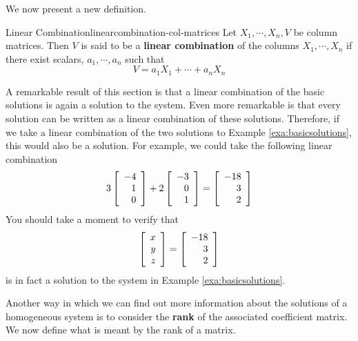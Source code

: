 We now present a new definition. 

\begin{definition}{Linear Combination}{linearcombination-col-matrices}
Let $X_1,\cdots ,X_n,V$ be column matrices. Then 
$V$ is said to be a \textbf{linear combination }
of the columns $X_1,\cdots , X_n $ 
if there exist scalars, $a_{1},\cdots ,a_{n}$ such
that
\begin{equation*}
V = a_1 X_1 + \cdots + a_n X_n
\end{equation*}
\end{definition}

A remarkable result of this section is that a linear combination of the basic solutions is again a solution to the system.
Even more remarkable is that every solution can be written as a linear combination of these solutions. 
Therefore, if we take a linear combination of the two solutions to Example \ref{exa:basicsolutions},
this would also be a solution. 
For example, we could take the following linear combination
\begin{equation*}
3
\left[
\begin{array}{r}
-4 \\
1 \\
0
\end{array}
\right]
+
2
\left[
\begin{array}{r}
-3 \\
0\\
1
\end{array}
\right]
 =
\left[
\begin{array}{r}
-18 \\
3 \\
2
\end{array}
\right]
\end{equation*}
You should take a moment to verify that
\begin{equation*}
\left[
\begin{array}{r}
x \\
y \\
z
\end{array}
\right]
=
\left[
\begin{array}{r}
-18 \\
3 \\
2
\end{array}
\right]
\end{equation*}
is in fact a solution to the system in Example \ref{exa:basicsolutions}.

Another way in which we can find out more information about the solutions of 
a homogeneous system is to consider the \textbf{rank} of the associated coefficient matrix. We
now define what is meant by the rank of a matrix.

